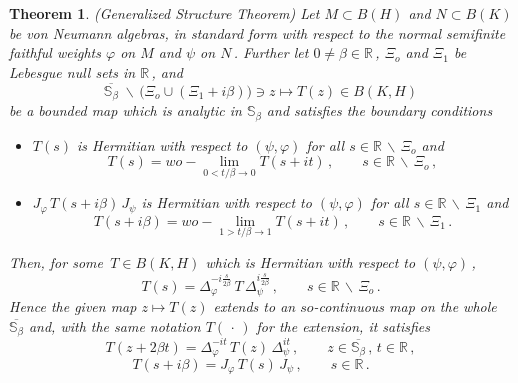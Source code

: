 \documentclass[reqno]{amsart}
\newtheorem{theorem}{Theorem}[section]
\theoremstyle{definition}
\theoremstyle{remark}
\numberwithin{equation}{section}
\theoremstyle{plain}
\begin{document}
\begin{theorem}\label{borchers}
{\rm (Generalized Structure Theorem)}
Let $M\subset B(H)$ and $N\subset B(K)$ be von Neumann algebras, in
standard form with respect to the normal semifinite faithful weights
$\varphi$ on $M$ and $\psi$ on $N\,$. Further let $0\neq\beta\in
\mathbb R\,$, $\Xi_o$ and $\Xi_1$ be Lebesgue null sets in
$\mathbb R\,$, and
\begin{equation*}
\overline{\mathbb S_\beta}\;\backslash\,\big(\Xi_o\cup (\Xi_1 +i\beta)
\big)\ni z\longmapsto T(z)\in B(K,H)
\end{equation*}
be a bounded map which is analytic in $\mathbb S_\beta$ and satisfies
the boundary conditions
\begin{itemize}
\item[(i)] $T(s)$ is Hermitian with respect to $(\psi ,\varphi )$
for all $s\in\mathbb R\,\backslash\,\Xi_o$ and
\begin{equation}\label{cont+}
T(s)=wo - \lim_{0<t/\beta \to 0} T(s+it)\, ,\qquad
s\in\mathbb R\,\backslash\,\Xi_o\, ,
\end{equation}
\item[(ii)] $J_\varphi\, T(s+i\beta )\, J_\psi$ is Hermitian with
respect to $(\psi ,\varphi )$ for all $s\in\mathbb R\,\backslash
\,\Xi_1$ and
\begin{equation}\label{cont-}
T(s+i\beta )=wo - \lim_{1>t/\beta \to 1} T(s+it)\, ,\qquad
s\in\mathbb R\,\backslash\,\Xi_1\, .
\end{equation}
\end{itemize}
Then, for some $\, T\in B(K,H)$ which is Hermitian with
respect to $(\psi ,\varphi )\,$,
\begin{equation}\label{formula}
T(s)=\Delta_\varphi^{\textstyle -i\frac s{2\beta}}\, T\,
\Delta_\psi^{\textstyle i\frac s{2\beta}}\, ,\qquad s\in\mathbb R\,
\backslash\,\Xi_o\, .
\end{equation}
Hence the given map $z\mapsto T(z)$ extends to an $so$-continuous map
on the whole $\overline{\mathbb S_\beta}$ and, with
the same notation $T(\,\cdot\, )$ for the extension, it satisfies
\begin{equation}\label{borch.transl}
T(z+2\beta t)=\Delta_\varphi^{-it}\, T(z)\,\Delta_\psi^{it}\, ,
\qquad z\in\overline{\mathbb S_\beta}\, ,\, t\in\mathbb R\, ,
\end{equation}
\begin{equation}\label{transl+ibeta}
T(s+i\beta )= J_\varphi\, T(s)\, J_\psi\, ,\qquad s\in\mathbb R\, .
\;\phantom{xx}
\end{equation}
\end{theorem}
\smallskip
\end{document}
